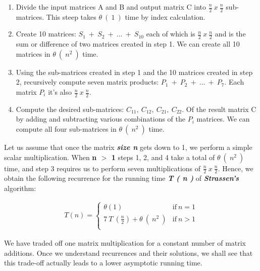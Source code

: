 \begin{enumerate}
\item Divide the input matrices A and B and output matrix C into {\bfseries\itshape $\frac{n}{2}\ x\ \frac{n}{2}$} sub-matrices. This steep takes $\theta\ (\ 1\ )$ time by index calculation. \hfill \break

\item 	Create 10 matrices: {\bfseries\itshape $S_{1}\ +\ S_{2}\ +\ ...\ +\ S_{10}$} each of which is {\bfseries\itshape $\frac{n}{2}\ x\ \frac{n}{2}$} and is the sum or difference of two matrices created in step 1. We can create all 10 matrices in $\theta\ (\ n^{2}\ )$ time. \hfill \break

\item Using the sub-matrices created in step 1 and the 10 matrices created in step 2, recursively compute seven matrix products: {\bfseries\itshape $P_{1}\ +\ P_{2}\ +\ ...\ +\ P_{7}$}. Each matrix $P_{i}$ it's also {\bfseries\itshape $\frac{n}{2}\ x\ \frac{n}{2}$}. \hfill \break

\item Compute the desired sub-matrices: {\bfseries\itshape $C_{11},\ C_{12},\ C_{21},\ C_{22}$}. Of the result matrix C by adding and subtracting various combinations of the $P_{i}$ matrices. We can compute all four sub-matrices in $\theta\ (\ n^{2}\ )$ time.
\end{enumerate} \hfill

Let us assume that once the matrix {\bfseries\itshape size n} gets down to 1, we perform a simple scalar multiplication. When {\bfseries n $>$ 1} steps 1, 2, and 4 take a total of $\theta\ (\ n^{2}\ )$ time, and step 3 requires us to perform seven multiplications of $\frac{n}{2}\ x\ \frac{n}{2}$. Hence, we obtain the following recurrence for the running time {\bfseries\itshape T ( n )} of {\bfseries\itshape Strassen's} algorithm: \hfill \break

\begin{ceqn}
\begin{align}
T( n ) = \left\{
\begin{array}{ll}
\theta ( 1 ) & \mathrm {if\ } n = 1 \\
7\ T\ (\frac{n}{2}) + \theta\ (\ n^{2}\ ) & \mathrm {if\ } n > 1 \\
\end{array}
\right.
\end{align}
\end{ceqn} \hfill

We have traded off one matrix multiplication for a constant number of matrix additions. Once we understand recurrences and their solutions, we shall see that this trade-off actually leads to a lower asymptotic running time. \hfill \break

